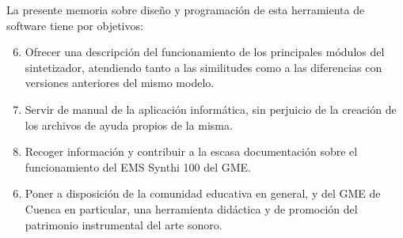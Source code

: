 La presente memoria sobre diseño y programación de esta herramienta de software tiene por objetivos:

\begin{enumerate}
	\setcounter{enumi}{5}
	\item Ofrecer una descripción del funcionamiento de los principales módulos del sintetizador, atendiendo tanto a las similitudes como a las diferencias con versiones anteriores del mismo modelo.
	\item Servir de manual de la aplicación informática, sin perjuicio de la creación de los archivos de ayuda propios de la misma.
	\item Recoger información y contribuir a la escasa documentación sobre el funcionamiento del EMS Synthi 100 del GME.
\end{enumerate}



\begin{enumerate}
	\setcounter{enumi}{5}
	\item Poner a disposición de la comunidad educativa en general, y del GME de Cuenca en particular, una herramienta didáctica y de promoción del patrimonio instrumental del arte sonoro.
\end{enumerate}


